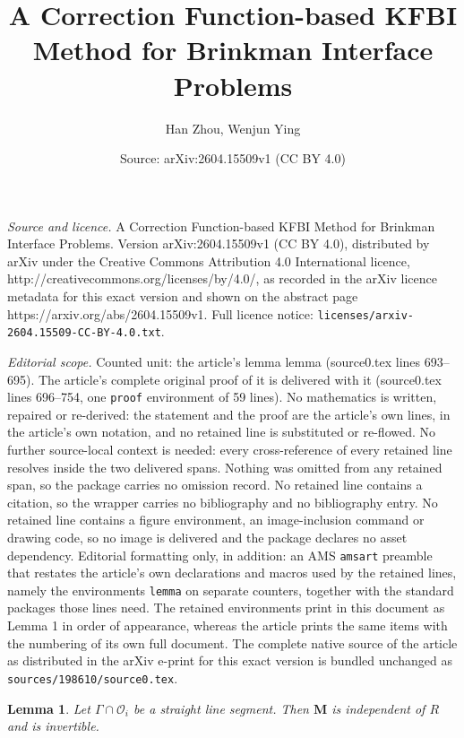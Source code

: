 \documentclass[10pt,a4paper]{amsart}
\title{A Correction Function-based KFBI Method for Brinkman Interface Problems}
\author{Han Zhou, Wenjun Ying}
\date{Source: arXiv:2604.15509v1 (CC BY 4.0)}
\newtheorem{lemma}{Lemma}
\newcommand{\bm}[1]{\boldsymbol{#1}}
\newcommand{\mc}[1]{\mathcal{#1}}
\begin{document}
\maketitle

\noindent\emph{Source and licence.} A Correction Function-based KFBI Method for Brinkman Interface Problems. Version arXiv:2604.15509v1 (CC BY 4.0), distributed by arXiv under the Creative Commons Attribution 4.0 International licence, http://creativecommons.org/licenses/by/4.0/, as recorded in the arXiv licence metadata for this exact version and shown on the abstract page https://arxiv.org/abs/2604.15509v1. Full licence notice: \texttt{licenses/arxiv-2604.15509-CC-BY-4.0.txt}.\par\smallskip

\noindent\textit{Editorial scope.} Counted unit: the article's lemma lemma (source0.tex lines 693--695). The article's complete original proof of it is delivered with it (source0.tex lines 696--754, one \texttt{proof} environment of 59 lines). No mathematics is written, repaired or re-derived: the statement and the proof are the article's own lines, in the article's own notation, and no retained line is substituted or re-flowed.  No further source-local context is needed: every cross-reference of every retained line resolves inside the two delivered spans.  Nothing was omitted from any retained span, so the package carries no omission record.  No retained line contains a citation, so the wrapper carries no bibliography and no bibliography entry.  No retained line contains a figure environment, an image-inclusion command or drawing code, so no image is delivered and the package declares no asset dependency.  Editorial formatting only, in addition: an AMS \texttt{amsart} preamble that restates the article's own declarations and macros used by the retained lines, namely the environments \texttt{lemma} on separate counters, together with the standard packages those lines need.  The retained environments print in this document as Lemma 1 in order of appearance, whereas the article prints the same items with the numbering of its own full document.  The complete native source of the article as distributed in the arXiv e-print for this exact version is bundled unchanged as \texttt{sources/198610/source0.tex}.
\begin{lemma}
    Let $\Gamma\cap \mc O_i$ be a straight line segment. Then $\bm M$ is independent of $R$ and is invertible.
\end{lemma}
\end{document}
